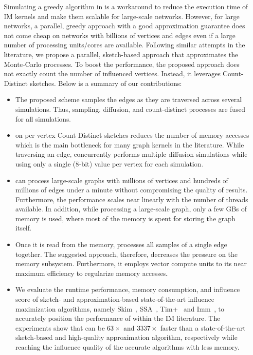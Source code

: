 Simulating a greedy algorithm in  is a  workaround to reduce the execution time of IM kernels and make them scalable for large-scale networks. However, for large networks, a parallel, greedy approach with a good approximation guarantee does not come cheap on networks with billions of vertices and edges even if a large number of processing units/cores are available. Following similar attempts in the literature, we propose a parallel, sketch-based approach that approximates the Monte-Carlo processes. To boost the performance, the proposed approach does not exactly count the number of influenced vertices. Instead, it leverages Count-Distinct sketches. Below is a summary of our contributions:

\begin{itemize} [leftmargin=0.3cm]
\item {} The proposed scheme samples the edges as they are traversed across several simulations. Thus, sampling, diffusion, and count-distinct processes are fused for all simulations. 

\item {} on per-vertex Count-Distinct sketches reduces the number of memory accesses which is the main bottleneck for many graph kernels in the literature. While traversing an edge, \acro concurrently performs multiple diffusion simulations while using only a single (8-bit) value per vertex for each simulation. 

\item \acro{} can process large-scale graphs with millions of vertices and hundreds of millions of edges under a minute without compromising the quality of results. Furthermore, the performance scales near linearly with the number of threads available. In addition, while processing a large-scale graph, only a few GBs of memory is used, where most of the memory is spent for storing the graph itself. 

\item Once it is read from the memory, \acro processes all samples of a single edge together. The suggested approach, therefore, decreases the pressure on the memory subsystem. Furthermore, it employs vector compute units to its near maximum efficiency to regularize memory accesses.

\item We evaluate the runtime performance, memory consumption, and influence score of sketch- and approximation-based state-of-the-art influence maximization algorithms, namely {\sc Skim}~\cite{cohen2014sketch}, {\sc SSA}~\cite{nguyen2016stop}, {\sc Tim+}~\cite{tim} and {\sc Imm}~\cite{minutoli2019fast}, to accurately position the performance of \acro{} within the IM literature. The experiments show that \acro can be $63\times$ and $3337\times$ faster than a state-of-the-art sketch-based and high-quality approximation algorithm, respectively while reaching the influence quality of the accurate algorithms with less memory.

\end{itemize}

